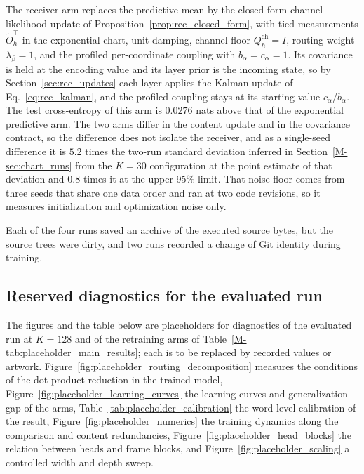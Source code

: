 \documentclass[twoside,11pt]{article}
\begin{document}
The receiver arm replaces the predictive mean by the closed-form channel-likelihood update of Proposition~\ref{prop:rec_closed_form}, with tied measurements $\widetilde O_h^\top$ in the exponential chart, unit damping, channel floor $Q_h^{\mathrm{ch}}=I$, routing weight $\lambda_\beta=1$, and the profiled per-coordinate coupling with $b_\alpha=c_\alpha=1$. Its covariance is held at the encoding value and its layer prior is the incoming state, so by Section~\ref{sec:rec_updates} each layer applies the Kalman update of Eq.~\eqref{eq:rec_kalman}, and the profiled coupling stays at its starting value $c_\alpha/b_\alpha$. The test cross-entropy of this arm is $0.0276$ nats above that of the exponential predictive arm. The two arms differ in the content update and in the covariance contract, so the difference does not isolate the receiver, and as a single-seed difference it is $5.2$ times the two-run standard deviation inferred in Section~\ref{M-sec:chart_runs} from the $K=30$ configuration at the point estimate of that deviation and $0.8$ times it at the upper 95\% limit. That noise floor comes from three seeds that share one data order and ran at two code revisions, so it measures initialization and optimization noise only.

Each of the four runs saved an archive of the executed source bytes, but the source trees were dirty, and two runs recorded a change of Git identity during training.

\subsection{Reserved diagnostics for the evaluated run}
\label{supp:reserved_diagnostics}

The figures and the table below are placeholders for diagnostics of the evaluated run at $K=128$ and of the retraining arms of Table~\ref{M-tab:placeholder_main_results}; each is to be replaced by recorded values or artwork. Figure~\ref{fig:placeholder_routing_decomposition} measures the conditions of the dot-product reduction in the trained model, Figure~\ref{fig:placeholder_learning_curves} the learning curves and generalization gap of the arms, Table~\ref{tab:placeholder_calibration} the word-level calibration of the result, Figure~\ref{fig:placeholder_numerics} the training dynamics along the comparison and content redundancies, Figure~\ref{fig:placeholder_head_blocks} the relation between heads and frame blocks, and Figure~\ref{fig:placeholder_scaling} a controlled width and depth sweep. %
\end{document}
